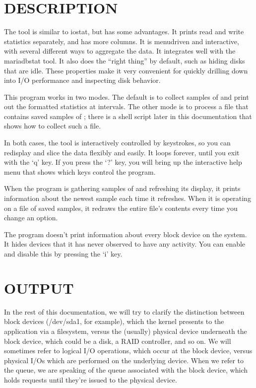 \documentclass[letterpaper,10pt,english]{sphinxmanual}
\begin{document}
\section{DESCRIPTION}
\label{\detokenize{mariadb-iostat:description}}
The  tool is similar to iostat, but has some advantages. It prints
read and write statistics separately, and has more columns. It is menu\sphinxhyphen{}driven
and interactive, with several different ways to aggregate the data. It
integrates well with the mariadb\sphinxhyphen{}stat tool. It also does the “right thing” by
default, such as hiding disks that are idle.  These properties make it very
convenient for quickly drilling down into I/O performance and inspecting disk
behavior.

This program works in two modes. The default is to collect samples of
 and print out the formatted statistics at intervals. The other
mode is to process a file that contains saved samples of ; there
is a shell script later in this documentation that shows how to collect such a
file.

In both cases, the tool is interactively controlled by keystrokes, so you can
redisplay and slice the data flexibly and easily.  It loops forever, until you
exit with the ‘q’ key.  If you press the ‘?’ key, you will bring up the
interactive help menu that shows which keys control the program.

When the program is gathering samples of  and refreshing its
display, it prints information about the newest sample each time it refreshes.
When it is operating on a file of saved samples, it redraws the entire file’s
contents every time you change an option.

The program doesn’t print information about every block device on the system. It
hides devices that it has never observed to have any activity.  You can enable
and disable this by pressing the ‘i’ key.


\section{OUTPUT}
\label{\detokenize{mariadb-iostat:output}}
In the rest of this documentation, we will try to clarify the distinction
between block devices (/dev/sda1, for example), which the kernel presents to the
application via a filesystem, versus the (usually) physical device underneath
the block device, which could be a disk, a RAID controller, and so on.  We will
sometimes refer to logical I/O operations, which occur at the block device,
versus physical I/Os which are performed on the underlying device.  When we
refer to the queue, we are speaking of the queue associated with the block
device, which holds requests until they’re issued to the physical device.
\end{document}
